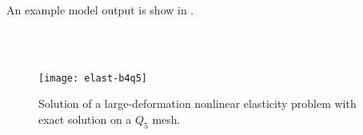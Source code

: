 An example model output is show in .

\cite{babuska2004vav} \\

\cite{roache2002cvm,roache2004bpc,salari2000code,knupp2003verification} \\


\begin{figure}
  \centering\texttt{[image: elast-b4q5]}
  \caption{Solution of a large-deformation nonlinear elasticity problem with exact solution on a $Q_5$ mesh.}\label{fig:elastexact}
\end{figure}
